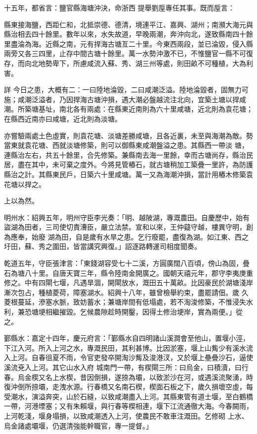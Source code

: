 \begin{pinyinscope}
 十五年，都省言：鹽官縣海塘沖決，命浙西
 提舉劉垕專任其事。既而垕言：



 縣東接海鹽，西距仁和，北抵崇德、德清，境連平江、嘉興、湖州；南瀕大海元與縣治相去四十餘里。數年以來，水失故道，早晚兩潮，奔沖向北，遂致縣南四十餘里盡淪為海。近縣之南，元有捍海古塘亙二十里。今東西兩段，並已淪毀，侵入縣兩旁又各三四里，止存中間古塘十餘里。萬一水勢沖激不已，不惟鹽官一縣不可復存，而向北地勢卑下，所慮咸流入蘇、秀、湖三州等處，則田畝不可種植，大為利害。



 詳
 今日之患，大概有二：一曰陸地淪毀，二曰咸潮泛溢。陸地淪毀者，固無力可施；咸潮泛溢者，乃因捍海古塘沖損，遇大潮必盤越流注北向，宜築土塘以捍咸潮。所築塘基址，南北各有兩處：在縣東近南則為六十里咸塘，近北則為袁花塘；在縣西近南亦曰咸塘，近北則為淡塘。



 亦嘗驗兩處土色虛實，則袁花塘、淡塘差勝咸塘，且各近裏，未至與海潮為敵。勢當東就袁花塘、西就淡塘修築，則可以御縣東咸潮盤溢之患。其縣西一帶淡
 塘，連縣治左右，共五十餘里，合先修築。兼縣南去海一里餘，幸而古塘尚存，縣治民居，盡在其中，未可棄之度外。今將見管樁石，就古塘稍加工築疊一里許，為防護縣治之計。其縣東民戶，日築六十里咸塘。萬一又為海潮沖損，當計用樁木修築袁花塘以捍之。



 上以為然。



 明州水：紹興五年，明州守臣李光奏：「明、越陂湖，專溉農田。自慶歷中，始有盜湖為田者，三司使切責漕臣，嚴立法禁。宣和以來，王仲薿守越，樓異守明，創為應奉，始廢
 湖為田，自是歲有水旱之患。乞行廢罷，盡復為湖。如江東、西之圩田，蘇、秀之圍田，皆當講究興復。」詔逐路轉運司相度聞奏。



 乾道五年，守臣張津言：「東錢湖容受七十二溪，方圓廣闊八百頃，傍山為固，疊石為塘八十里。自唐天寶三年，縣令陸南金開廣之。國朝天禧元年，郡守李夷庚重修之。中有四閘七堰，凡遇旱涸，開閘放水，溉田五十萬畝。比因豪民於湖塘淺岸漸次包占，種植菱荷，障塞湖水。紹興十八年，雖曾檢舉約束，盡罷請佃。歲
 久菱根蔓延，滲塞水脈，致妨蓄水；兼塘岸間有低塌處，若不淘浚修築，不惟浸失水利，兼恐塘埂相繼摧毀。乞候農隙趁時開鑿，因得土修治埂岸，實為兩便。」從之。



 鄞縣水：嘉定十四年，慶元府言：「鄞縣水自四明諸山溪澗會至他山，置堰小涇，下江入河。所入上河之水，專溉民田，其利甚博。比因淤塞，堰上山觜少有溪水流入上河。自春徂夏不雨，令官吏發卒開淘沙觜及浚港汊，又於堰上壘疊沙石，逼使溪流兗入上河。其它山水入府
 城南門一帶，有楔閘三所：曰烏金，曰積瀆，曰行春。烏金楔又名上水楔，昔因倒損，遂捺為壩，以致淤沙在河，或遇溪流聚湧，時復沖倒所捺壩，走洩水源。行春橋又名南石楔，楔面石板之下，歲久損壞空虛，每受潮水，演溢奔突，山於石縫，以致咸潮盡入上河。其縣東管有道士堰，至白鶴橋一帶，河港堙塞；又有朱賴堰，與行春等楔相連，堰下江流通徹大海。今春闕雨，上河乾淺，堰身塌損，以致咸潮透入上河，使農民不敢車注溉田。乞修砌
 上水、烏金諸處壩堰，仍選清強能幹職官，專一提督。」




\end{pinyinscope}
